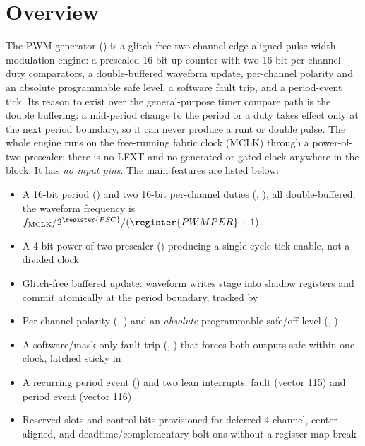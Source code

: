 \section{Overview}

The PWM generator () is a glitch-free two-channel edge-aligned pulse-width-modulation engine: a prescaled 16-bit up-counter with two 16-bit per-channel duty comparators, a double-buffered waveform update, per-channel polarity and an absolute programmable safe level, a software fault trip, and a period-event tick. Its reason to exist over the general-purpose timer compare path is the double buffering: a mid-period change to the period or a duty takes effect only at the next period boundary, so it can never produce a runt or double pulse. The whole engine runs on the free-running fabric clock (MCLK) through a power-of-two prescaler; there is no LFXT and no generated or gated clock anywhere in the block. It has \emph{no input pins}. The main features are listed below:

\begin{itemize}
	\item A 16-bit period () and two 16-bit per-channel duties (, ), all double-buffered; the waveform frequency is $f_\text{MCLK} / 2^{\register{PSC}} / (\register{PWMPER}+1)$
	\item A 4-bit power-of-two prescaler () producing a single-cycle tick enable, not a divided clock
	\item Glitch-free buffered update: waveform writes stage into shadow registers and commit atomically at the period boundary, tracked by 
	\item Per-channel polarity (, ) and an \emph{absolute} programmable safe/off level (, )
	\item A software/mask-only fault trip (, ) that forces both outputs safe within one clock, latched sticky in 
	\item A recurring period event () and two lean interrupts: fault (vector 115) and period event (vector 116)
	\item Reserved slots and control bits provisioned for deferred 4-channel, center-aligned, and deadtime/complementary bolt-ons without a register-map break
\end{itemize}


